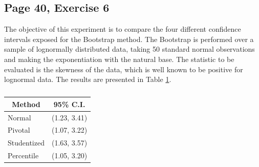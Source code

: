 \documentclass[11pt]{article}
\theoremstyle{definition}
\theoremstyle{remark}
\theoremstyle{remark}
\begin{document}
\subsection*{Page 40, Exercise 6}
The objective of this experiment is to compare the four different
confidence intervals exposed for the Bootstrap method. The Bootstrap
is performed over a sample of lognormally distributed data, taking 50
standard normal observations and making the exponentiation with the
natural base. The statistic to be evaluated is the skewness of the
data, which is well known to be positive for lognormal data. The
results are presented in Table \ref{tab:cis}.
\begin{table}[H]
  \centering
\begin{tabular}{ll}
  \hline
  \multicolumn{1}{c}{\textbf{Method}} & \multicolumn{1}{c}{\textbf{95\% C.I.}} \\ \hline
  Normal                              & (1.23, 3.41)                           \\
  Pivotal                             & (1.07, 3.22)                           \\
  Studentized                         & (1.63, 3.57)                           \\
  Percentile                          & (1.05, 3.20)                           \\ \hline
\end{tabular}
\caption{}
\label{tab:cis}
\end{table}
\end{document}
